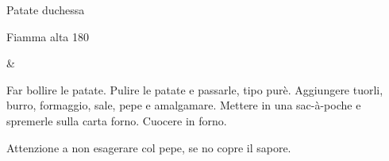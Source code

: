 \begin{recipe}{Patate duchessa}
    \begin{header}

           {Fiamma alta}
            {180}
    \end{header}
    
    \begin{ingredients}
        
        & \\
    \end{ingredients}
    
    \begin{preparation}
        \step Far bollire le patate.
        \step Pulire le patate e passarle, tipo purè.
        \step Aggiungere tuorli, burro, formaggio, sale, pepe e amalgamare.
        \step Mettere in una sac-à-poche e spremerle sulla carta forno.
        \step Cuocere in forno.
    \end{preparation}
    
    \begin{suggestion}
        \suggestionMark Attenzione a non esagerare col pepe, se no copre il sapore.
    \end{suggestion}
\end{recipe}
